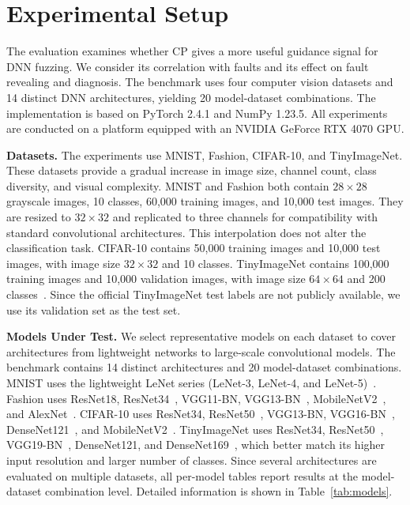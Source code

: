 \documentclass[preprint,number,5p,twocolumn]{elsarticle}
\begin{document}


\section{Experimental Setup}\label{sec:experiment}

The evaluation examines whether CP gives a more useful guidance signal for DNN fuzzing. We consider its correlation with faults and its effect on fault revealing and diagnosis. The benchmark uses four computer vision datasets and 14 distinct DNN architectures, yielding 20 model-dataset combinations. The implementation is based on PyTorch 2.4.1 and NumPy 1.23.5. All experiments are conducted on a platform equipped with an NVIDIA GeForce RTX 4070 GPU.

\textbf{Datasets.} The experiments use MNIST, Fashion, CIFAR-10, and TinyImageNet. These datasets provide a gradual increase in image size, channel count, class diversity, and visual complexity. MNIST and Fashion both contain $28 \times 28$ grayscale images, 10 classes, 60,000 training images, and 10,000 test images. They are resized to $32 \times 32$ and replicated to three channels for compatibility with standard convolutional architectures. This interpolation does not alter the classification task. CIFAR-10 contains 50,000 training images and 10,000 test images, with image size $32 \times 32$ and 10 classes. TinyImageNet contains 100,000 training images and 10,000 validation images, with image size $64 \times 64$ and 200 classes~\cite{le2015tiny}. Since the official TinyImageNet test labels are not publicly available, we use its validation set as the test set.

\textbf{Models Under Test.} We select representative models on each dataset to cover architectures from lightweight networks to large-scale convolutional models. The benchmark contains 14 distinct architectures and 20 model-dataset combinations. MNIST uses the lightweight LeNet series (LeNet-3, LeNet-4, and LeNet-5)~\cite{lenet}. Fashion uses ResNet18, ResNet34~\cite{HeZRS16}, VGG11-BN, VGG13-BN~\cite{vgg}, MobileNetV2~\cite{mobilenet_v2}, and AlexNet~\cite{krizhevsky2012imagenet}. CIFAR-10 uses ResNet34, ResNet50~\cite{HeZRS16}, VGG13-BN, VGG16-BN~\cite{vgg}, DenseNet121~\cite{Densenet}, and MobileNetV2~\cite{mobilenet_v2}. TinyImageNet uses ResNet34, ResNet50~\cite{HeZRS16}, VGG19-BN~\cite{vgg}, DenseNet121, and DenseNet169~\cite{Densenet}, which better match its higher input resolution and larger number of classes. Since several architectures are evaluated on multiple datasets, all per-model tables report results at the model-dataset combination level. Detailed information is shown in Table~\ref{tab:models}.
\end{document}
